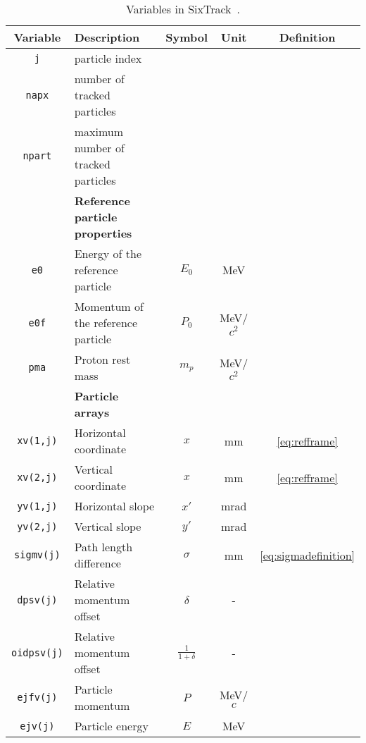 \begin{table}[b]
\centering
\caption{Variables in SixTrack~\cite{STdevwiki}.}
\label{tab:sixtrack_variables}
\begin{tabular}{clccc}
\toprule
Variable             & Description                                   & Symbol     & Unit & Definition  \\ \midrule
\texttt{j}           & particle index                                &                      &      &   \\
\texttt{napx}        & number of tracked particles                   &                      &      &   \\
\texttt{npart}       & maximum number of tracked particles           &                      &      &   \\ \midrule
 & \textbf{Reference particle properties} \\ \midrule
\texttt{e0}          & Energy of the reference particle              & $E_0$                & MeV  &                      \\
\texttt{e0f}         & Momentum of the reference particle            & $P_0$                & MeV/$c^2$  &                      \\ 
\texttt{pma}         & Proton rest mass            & $m_p$                & MeV/$c^2$  &               \\ \midrule
 & \textbf{Particle arrays} \\ \midrule
\texttt{xv(1,j)}     & Horizontal coordinate                         & $x$                  & mm   & \eqref{eq:refframe}  \\
\texttt{xv(2,j)}     & Vertical coordinate                           & $x$                  & mm   & \eqref{eq:refframe}  \\
\texttt{yv(1,j)}     & Horizontal slope                              & $x'$                 & mrad \\
\texttt{yv(2,j)}     & Vertical slope                                & $y'$                 & mrad \\
\texttt{sigmv(j)}    & Path length difference                        & $\sigma$             & mm   & \eqref{eq:sigmadefinition}  \\
\texttt{dpsv(j)}     & Relative momentum offset                      & $\delta$             & -    &      \\
\texttt{oidpsv(j)}   & Relative momentum offset                      & $\frac{1}{1+\delta}$ & -    &     \\
\texttt{ejfv(j)}     & Particle momentum                             & $P$                  & MeV/$c$    &     \\
\texttt{ejv(j)}      & Particle energy                               & $E$                  & MeV    &     \\ \bottomrule
\end{tabular}
\end{table}




